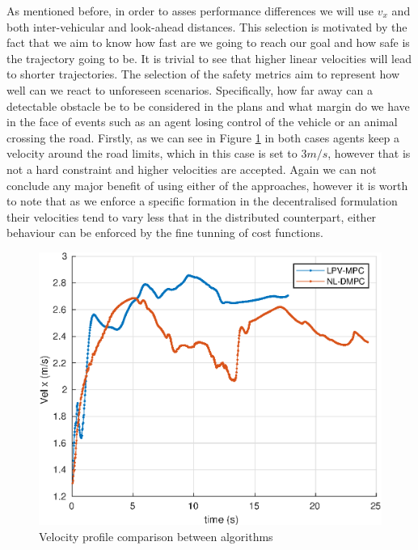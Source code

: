 \documentclass[a4paper,fleqn]{cas-sc}
\begin{document}

As mentioned before, in order to asses performance differences we will use $v_x$ and both inter-vehicular and look-ahead distances. This selection is motivated by the fact that we aim to know how fast are we going to reach our goal and how safe is the trajectory going to be. It is trivial to see that higher linear velocities will lead to shorter trajectories. The selection of the safety metrics aim to represent how well can we react to unforeseen scenarios. Specifically, how far away can a detectable obstacle be to be considered in the plans and what margin do we have in the face of events such as an agent losing control of the vehicle or an animal crossing the road. Firstly, as we can see in Figure \ref{fig:Vcomp} in both cases agents keep a velocity around the road limits, which in this case is set to $3 m/s$, however that is not a hard constraint and higher velocities are accepted. Again we can not conclude any major benefit of using either of the approaches, however it is worth to note that as we enforce a specific formation in the decentralised formulation their velocities tend to vary less that in the distributed counterpart, either behaviour can be enforced by the fine tunning of cost functions.\\ 

\begin{figure}[h]
    \centering
    \includegraphics[width=.43\textwidth]{figs/experiments/vel.eps}
    \caption{Velocity profile comparison between algorithms }
    \label{fig:Vcomp}
\end{figure}
\end{document}
